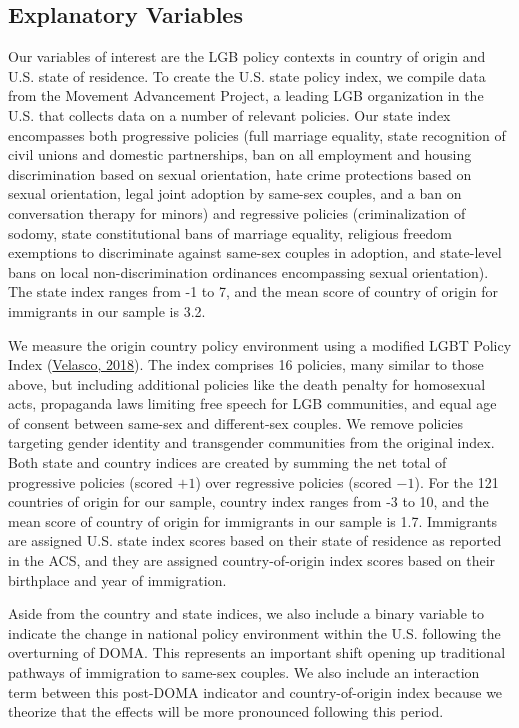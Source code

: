 \documentclass[
  12pt,
]{article}
\begin{document}
\hypertarget{explanatory-variables}{%
\subsection{Explanatory Variables}\label{explanatory-variables}}

Our variables of interest are the LGB policy contexts in country of origin and U.S. state of residence. To create the U.S. state policy index, we compile data from the Movement Advancement Project, a leading LGB organization in the U.S. that collects data on a number of relevant policies. Our state index encompasses both progressive policies (full marriage equality, state recognition of civil unions and domestic partnerships, ban on all employment and housing discrimination based on sexual orientation, hate crime protections based on sexual orientation, legal joint adoption by same-sex couples, and a ban on conversation therapy for minors) and regressive policies (criminalization of sodomy, state constitutional bans of marriage equality, religious freedom exemptions to discriminate against same-sex couples in adoption, and state-level bans on local non-discrimination ordinances encompassing sexual orientation). The state index ranges from -1 to 7, and the mean score of country of origin for immigrants in our sample is 3.2.

We measure the origin country policy environment using a modified LGBT Policy Index (\protect\hyperlink{ref-velasco_2018}{Velasco, 2018}). The index comprises 16 policies, many similar to those above, but including additional policies like the death penalty for homosexual acts, propaganda laws limiting free speech for LGB communities, and equal age of consent between same-sex and different-sex couples. We remove policies targeting gender identity and transgender communities from the original index. Both state and country indices are created by summing the net total of progressive policies (scored \(+1\)) over regressive policies (scored \(-1\)). For the 121 countries of origin for our sample, country index ranges from -3 to 10, and the mean score of country of origin for immigrants in our sample is 1.7. Immigrants are assigned U.S. state index scores based on their state of residence as reported in the ACS, and they are assigned country-of-origin index scores based on their birthplace and year of immigration.

Aside from the country and state indices, we also include a binary variable to indicate the change in national policy environment within the U.S. following the overturning of DOMA. This represents an important shift opening up traditional pathways of immigration to same-sex couples. We also include an interaction term between this post-DOMA indicator and country-of-origin index because we theorize that the effects will be more pronounced following this period.
\end{document}
